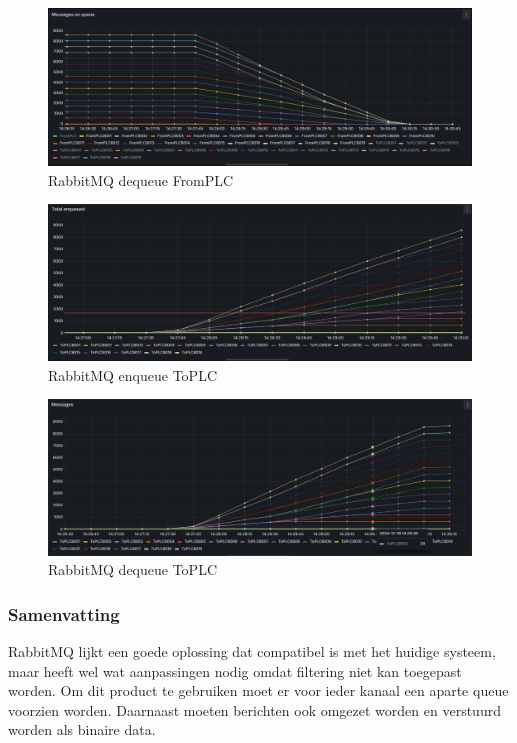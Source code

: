 \begin{figure}[h!]
  \centering
  \includegraphics[width=.95\textwidth]{img/rabbitmq-dequeue-count-FromPLC.png}
  \caption{\label{fig:rabbitmq_dequeue_fromplc_count}RabbitMQ dequeue FromPLC}
\end{figure}

\begin{figure}[h!]
  \centering
  \includegraphics[width=.95\textwidth]{img/rabbitmq-enqueue-count-ToPLC.png}
  \caption{\label{fig:rabbitmq_enqueue_toplc_count}RabbitMQ enqueue ToPLC}
\end{figure}

\begin{figure}[h!]
  \centering
  \includegraphics[width=.95\textwidth]{img/rabbitmq-dequeue-count-ToPLC.png}
  \caption{\label{fig:fig:rabbitmq_dequeue_fromplc_count}RabbitMQ dequeue ToPLC}
\end{figure}

\subsubsection{Samenvatting}
RabbitMQ lijkt een goede oplossing dat compatibel is met het huidige systeem, 
maar heeft wel wat aanpassingen nodig omdat filtering niet kan toegepast worden.
Om dit product te gebruiken moet er voor ieder kanaal een aparte queue voorzien worden.
Daarnaast moeten berichten ook omgezet worden en verstuurd worden als binaire data.
\newpage

